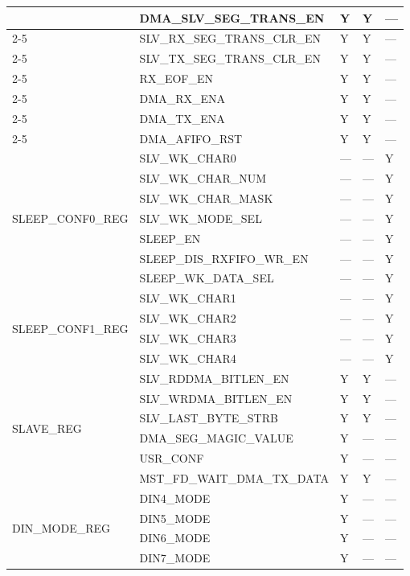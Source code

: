 \documentclass[main\_\_CN.tex]{subfiles}
\begin{document}
\begin{longtable}{|p{4.0cm}|p{6.0cm}|p{1.5cm}|p{1.5cm}|p{1.5cm}|}
& DMA\_SLV\_SEG\_TRANS\_EN & Y & Y & --- \\ \cline{2-5}
& SLV\_RX\_SEG\_TRANS\_CLR\_EN & Y & Y & --- \\ \cline{2-5}
& SLV\_TX\_SEG\_TRANS\_CLR\_EN & Y & Y & --- \\ \cline{2-5}
& RX\_EOF\_EN & Y & Y & --- \\ \cline{2-5}
& DMA\_RX\_ENA & Y & Y & --- \\ \cline{2-5}
& DMA\_TX\_ENA & Y & Y & --- \\ \cline{2-5}
& DMA\_AFIFO\_RST & Y & Y & --- \\ \hline
\multirow{7}{*}{SLEEP\_CONF0\_REG} & SLV\_WK\_CHAR0 & --- & --- & Y \\ \cline{2-5}
& SLV\_WK\_CHAR\_NUM & --- & --- & Y \\ \cline{2-5}
& SLV\_WK\_CHAR\_MASK & --- & --- & Y \\ \cline{2-5}
& SLV\_WK\_MODE\_SEL & --- & --- & Y \\ \cline{2-5}
& SLEEP\_EN & --- & --- & Y \\ \cline{2-5}
& SLEEP\_DIS\_RXFIFO\_WR\_EN & --- & --- & Y \\ \cline{2-5}
& SLEEP\_WK\_DATA\_SEL & --- & --- & Y \\ \hline
\multirow{4}{*}{SLEEP\_CONF1\_REG} & SLV\_WK\_CHAR1 & --- & --- & Y \\ \cline{2-5}
& SLV\_WK\_CHAR2 & --- & --- & Y \\ \cline{2-5}
& SLV\_WK\_CHAR3 & --- & --- & Y \\ \cline{2-5}
& SLV\_WK\_CHAR4 & --- & --- & Y \\ \hline
\multirow{6}{*}{SLAVE\_REG} & SLV\_RDDMA\_BITLEN\_EN & Y & Y & --- \\ \cline{2-5}
& SLV\_WRDMA\_BITLEN\_EN & Y & Y & --- \\ \cline{2-5}
& SLV\_LAST\_BYTE\_STRB & Y & Y & --- \\ \cline{2-5}
& DMA\_SEG\_MAGIC\_VALUE & Y & --- & --- \\ \cline{2-5}
& USR\_CONF & Y & --- & --- \\ \cline{2-5}
& MST\_FD\_WAIT\_DMA\_TX\_DATA & Y & Y & --- \\ \hline
\multirow{4}{*}{DIN\_MODE\_REG} & DIN4\_MODE & Y & --- & --- \\ \cline{2-5}
& DIN5\_MODE & Y & --- & --- \\ \cline{2-5}
& DIN6\_MODE & Y & --- & --- \\ \cline{2-5}
& DIN7\_MODE & Y & --- & --- \\ \hline

\end{longtable}
\end{document}
